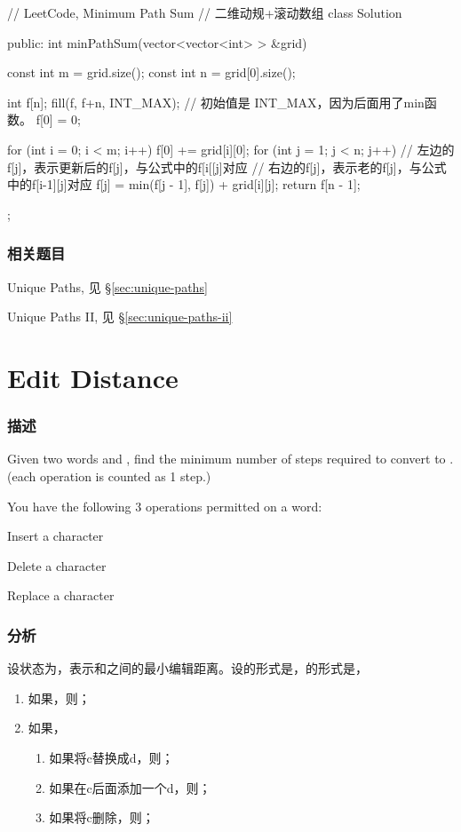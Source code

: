 \begin{Code}
// LeetCode, Minimum Path Sum
// 二维动规+滚动数组
class Solution {
public:
    int minPathSum(vector<vector<int> > &grid) {
        const int m = grid.size();
        const int n = grid[0].size();

        int f[n];
        fill(f, f+n, INT_MAX); // 初始值是 INT_MAX，因为后面用了min函数。
        f[0] = 0;

        for (int i = 0; i < m; i++) {
            f[0] += grid[i][0];
            for (int j = 1; j < n; j++) {
                // 左边的f[j]，表示更新后的f[j]，与公式中的f[i[[j]对应
                // 右边的f[j]，表示老的f[j]，与公式中的f[i-1][j]对应
                f[j] = min(f[j - 1], f[j]) + grid[i][j];
            }
        }
        return f[n - 1];
    }
};
\end{Code}

\subsubsection{相关题目}
\begindot
\item Unique Paths, 见 \S \ref{sec:unique-paths}
\item Unique Paths II, 见 \S \ref{sec:unique-paths-ii}
\myenddot


\section{Edit Distance} %
\label{sec:edit-distance}


\subsubsection{描述}
Given two words  and , find the minimum number of steps required to convert  to . (each operation is counted as 1 step.)

You have the following 3 operations permitted on a word:
\begindot
\item Insert a character
\item Delete a character
\item Replace a character
\myenddot


\subsubsection{分析}
设状态为，表示和之间的最小编辑距离。设的形式是，的形式是，
\begin{enumerate}
\item 如果，则；
\item 如果，
    \begin{enumerate}
        \item 如果将c替换成d，则；
        \item 如果在c后面添加一个d，则；
        \item 如果将c删除，则；
    \end{enumerate}
\end{enumerate}


